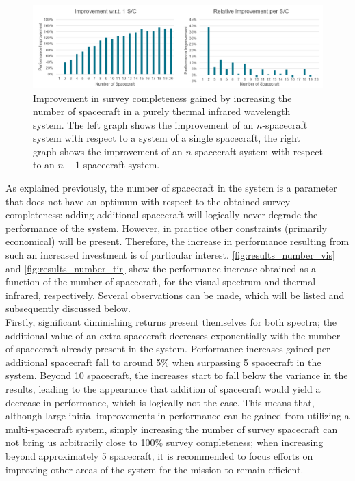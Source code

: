 \begin{figure}[htbp]
 \centering
 \includegraphics[width=1.0\textwidth]{img/number_sc_tir.png}
 \caption{Improvement in survey completeness gained by increasing the number of spacecraft in a purely thermal infrared wavelength system. The left graph shows the improvement of an $n$-spacecraft system with respect to a system of a single spacecraft, the right graph shows the improvement of an $n$-spacecraft system with respect to an $n-1$-spacecraft system.}
 \label{fig:results_number_tir}
\end{figure}

As explained previously, the number of spacecraft in the system is a parameter that does not have an optimum with respect to the obtained survey completeness: adding additional spacecraft will logically never degrade the performance of the system. However, in practice other constraints (primarily economical) will be present. Therefore, the increase in performance resulting from such an increased investment is of particular interest. \autoref{fig:results_number_vis} and \autoref{fig:results_number_tir} show the performance increase obtained as a function of the number of spacecraft, for the visual spectrum and thermal infrared, respectively. Several observations can be made, which will be listed and subsequently discussed below.\\

Firstly, significant diminishing returns present themselves for both spectra; the additional value of an extra spacecraft decreases exponentially with the number of spacecraft already present in the system. Performance increases gained per additional spacecraft fall to around 5\% when surpassing 5 spacecraft in the system. Beyond 10 spacecraft, the increases start to fall below the variance in the results, leading to the appearance that addition of spacecraft would yield a decrease in performance, which is logically not the case. This means that, although large initial improvements in performance can be gained from utilizing a multi-spacecraft system, simply increasing the number of survey spacecraft can not bring us arbitrarily close to 100\% survey completeness; when increasing beyond approximately 5 spacecraft, it is recommended to focus efforts on improving other areas of the system for the mission to remain efficient. \\

